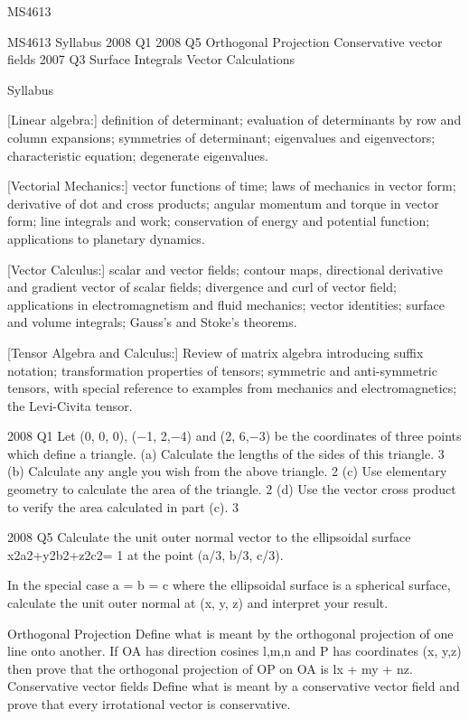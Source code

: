 MS4613

MS4613
Syllabus
2008 Q1
2008 Q5
Orthogonal Projection
Conservative vector fields
2007 Q3
Surface Integrals
Vector Calculations

Syllabus

[Linear algebra:] definition of determinant; evaluation of determinants by row and column
expansions; symmetries of determinant; eigenvalues and eigenvectors; characteristic
equation; degenerate eigenvalues.

[Vectorial Mechanics:] vector functions of time; laws of mechanics in vector form;
derivative of dot and cross products; angular momentum and torque in vector form; line
integrals and work; conservation of energy and potential function; applications to planetary
dynamics.

[Vector Calculus:] scalar and vector fields; contour maps, directional derivative and gradient
vector of scalar fields; divergence and curl of vector field; applications in electromagnetism
and fluid mechanics; vector identities; surface and volume integrals; Gauss's and Stoke's
theorems.

[Tensor Algebra and Calculus:] Review of matrix algebra introducing suffix notation;
transformation properties of tensors; symmetric and anti-symmetric tensors, with special
reference to examples from mechanics and electromagnetics;
the Levi-Civita tensor.

2008 Q1
Let (0, 0, 0), (−1, 2,−4) and (2, 6,−3) be the coordinates of three points which define a triangle.
(a) Calculate the lengths of the sides of this triangle. 3%
(b) Calculate any angle you wish from the above triangle. 2%
(c) Use elementary geometry to calculate the area of the triangle. 2%
(d) Use the vector cross product to verify the area calculated in part (c). 3%

2008 Q5
Calculate the unit outer normal vector to the ellipsoidal surface x2a2+y2b2+z2c2= 1
at the point (a/3, b/3, c/3).

In the special case a = b = c where the ellipsoidal surface is a spherical surface, 
calculate the unit outer normal at (x, y, z) and interpret your result. 

Orthogonal Projection
Define what is meant by the orthogonal projection of one line onto another. 
If OA has direction cosines l,m,n and P has coordinates (x, y,z) then prove that the orthogonal projection of OP on OA is
lx + my + nz.
Conservative vector fields
Define what is meant by a conservative vector field and prove that every irrotational vector is conservative.



